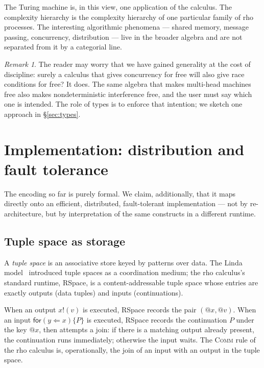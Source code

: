 \documentclass[11pt]{article}
\makeatletter
\theoremstyle{plain}
\theoremstyle{definition}
\theoremstyle{remark}
\newtheorem{remark}[theorem]{Remark}
\newcommand{\quo}[1]{@#1}
\newcommand{\snd}[2]{#1!(#2)}
\newcommand{\rcv}[3]{\mathsf{for}(#1 \Leftarrow #2)\{#3\}}
\makeatother
\begin{document}
The Turing machine is, in this view, one application of the calculus.
The complexity hierarchy is the complexity hierarchy of one particular
family of rho processes. The interesting algorithmic phenomena --- shared
memory, message passing, concurrency, distribution --- live in the broader
algebra and are not separated from it by a categorial line.

\begin{remark}
The reader may worry that we have gained generality at the cost of
discipline: surely a calculus that gives concurrency for free will also
give race conditions for free? It does. The same algebra that makes
multi-head machines free also makes nondeterministic interference
free, and the user must say which one is intended. The role of types is
to enforce that intention; we sketch one approach in \S\ref{sec:types}.
\end{remark}

\section{Implementation: distribution and fault tolerance}\label{sec:impl}

The encoding so far is purely formal. We claim, additionally, that it
maps directly onto an efficient, distributed, fault-tolerant
implementation --- not by re-architecture, but by interpretation of the
same constructs in a different runtime.

\subsection{Tuple space as storage}

A \emph{tuple space} is an associative store keyed by patterns over
data. The Linda model~\cite{Gelernter85} introduced tuple spaces as a
coordination medium; the rho calculus's standard runtime, RSpace, is a
content-addressable tuple space whose entries are exactly outputs (data
tuples) and inputs (continuations).

When an output $\snd{x}{v}$ is executed, RSpace records the pair
$(\quo{x}, \quo{v})$. When an input $\rcv{y}{x}{P}$ is executed, RSpace
records the continuation $P$ under the key $\quo{x}$, then attempts a
join: if there is a matching output already present, the continuation
runs immediately; otherwise the input waits. The \textsc{Comm} rule of
the rho calculus is, operationally, the join of an input with an output
in the tuple space.
\end{document}
